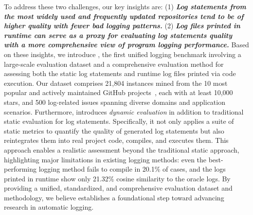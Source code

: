 


To address these two challenges, our key insights are: (1) \textit{\textbf{Log statements from the most widely used and frequently updated repositories tend to be of higher quality with fewer bad logging patterns.}} (2) \textit{\textbf{Log files printed in runtime can serve as a proxy for evaluating log statements quality with a more comprehensive view of program logging performance.}}
Based on these insights, we introduce \methodname, the first unified logging benchmark involving a large-scale evaluation dataset and a comprehensive evaluation method for assessing both the static log statements and runtime log files printed via code execution.
Our dataset comprises 21,804 instances mined from the 10 most popular and actively maintained GitHub projects~\cite{GitHub}, each with at least 10,000 stars, and 500 log-related issues spanning diverse domains and application scenarios.
Furthermore, \methodname introduces \textit{dynamic evaluation} in addition to traditional static evaluation for log statements.
Specifically, it not only applies a suite of static metrics to quantify the quality of generated log statements but also reintegrates them into real project code, compiles, and executes them.
This approach enables a realistic assessment beyond the traditional static approach, highlighting major limitations in existing logging methods:  even the best-performing logging method fails to compile in 20.1\% of cases, and the logs printed in runtime show only 21.32\% cosine similarity to the oracle logs.
By providing a unified, standardized, and comprehensive evaluation dataset and methodology, we believe \methodname establishes a foundational step toward advancing research in automatic logging.


